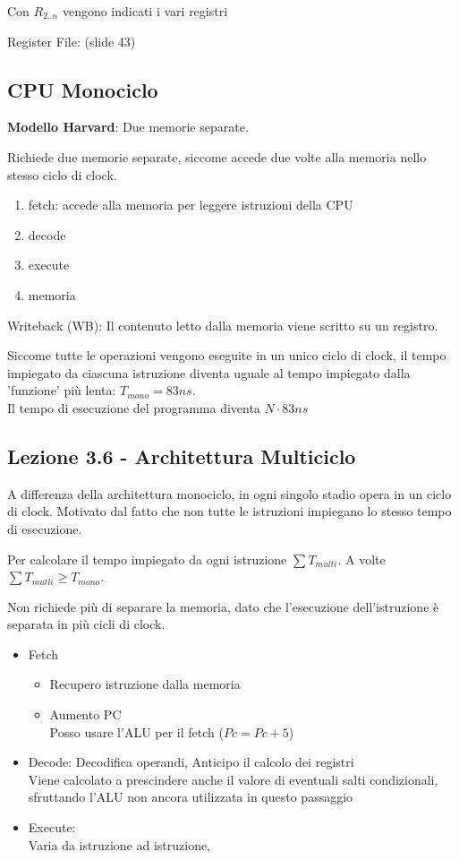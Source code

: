 \documentclass[a4paper,10pt]{article}
\begin{document}
Con $R_{2..n}$ vengono indicati i vari registri

Register File: (slide 43)

\subsection{CPU Monociclo}
\textbf{Modello Harvard}: Due memorie separate.%

Richiede due memorie separate, siccome accede due volte alla memoria nello stesso ciclo di clock.

\begin{enumerate}
    \item fetch: accede alla memoria per leggere istruzioni della CPU
    \item decode
    \item execute
    \item memoria
\end{enumerate}

Writeback (WB): Il contenuto letto dalla memoria viene scritto su un registro.

Siccome tutte le operazioni vengono eseguite in un unico ciclo di clock, il tempo impiegato da ciascuna istruzione diventa uguale al tempo impiegato dalla 'funzione' più lenta: $T_{mono} = 83 ns$.
\\
Il tempo di esecuzione del programma diventa $N \cdot 83ns$

\subsection{Lezione 3.6 - Architettura Multiciclo}
A differenza della architettura monociclo, in ogni singolo stadio opera in un ciclo di clock.
Motivato dal fatto che non tutte le istruzioni impiegano lo stesso tempo di esecuzione.

Per calcolare il tempo impiegato da ogni istruzione $\sum{T_{multi}}$.
A volte $\sum{T_{mutli}} \ge T_{mono}$.

Non richiede più di separare la memoria, dato che l'esecuzione dell'istruzione è separata in più cicli di clock.

\begin{itemize}
    \item Fetch
        \begin{itemize}
            \item Recupero istruzione dalla memoria
            \item Aumento PC
                \\
                Posso usare l'ALU per il fetch ($Pc = Pc + 5$)
        \end{itemize}
    \item Decode:
        Decodifica operandi, Anticipo il calcolo dei registri
        \\
        Viene calcolato a prescindere anche il valore di eventuali salti condizionali,
        sfruttando l'ALU non ancora utilizzata in questo passaggio

    \item Execute:
        \\
        Varia da istruzione ad istruzione,
\end{itemize}
\end{document}
